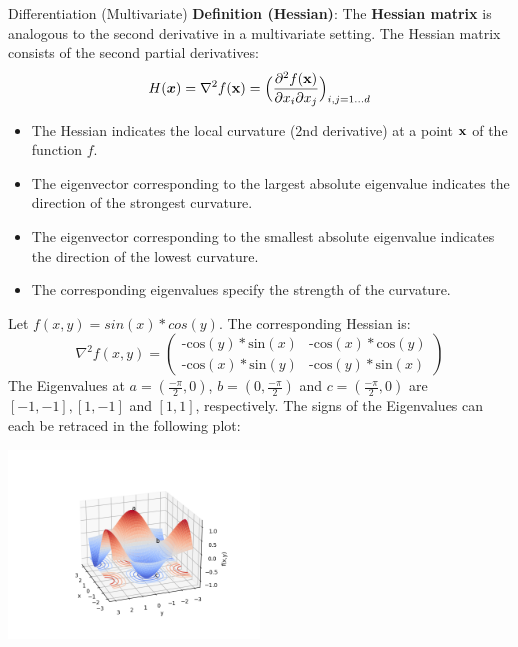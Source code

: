 \begin{vbframe}{Differentiation (Multivariate)}
  \textbf{Definition (Hessian)}: The \textbf{Hessian matrix} is analogous to the second derivative in a multivariate setting. The Hessian matrix consists of the second partial derivatives:
  \[ H(\boldsymbol{x}) =\nabla^2 f(\mathbf{x}) =
  \Bigl(\frac{\partial^2 f(\mathbf{x})}{\partial x_i \partial x_j}\Bigr)_{i,j=1\ldots d}\]
  \begin{itemize}
  \item The Hessian indicates the local curvature (2nd derivative) at a point $\mathbf{x}$ of the function $f$.
  \item The eigenvector corresponding to the largest absolute eigenvalue indicates the direction of the strongest curvature.
  \item The eigenvector corresponding to the smallest absolute eigenvalue indicates the direction of the lowest curvature.
  \item The corresponding eigenvalues specify the strength of the curvature.
  \end{itemize}


  \framebreak 

    Let $f(x,y) = sin(x) * cos(y)$.
    The corresponding Hessian is: 
    \vspace*{-0.2cm}
    $$
    \nabla^2 f(x,y) = \begin{pmatrix}
    \text{-cos}(y)*\text{sin}(x) & \text{-cos}(x)*\text{cos}(y) 
    \\ \text{-cos}(x)*\text{sin}(y) & \text{-cos}(y)*\text{sin}(x) 
    \end{pmatrix}
    $$
    \newline
    The Eigenvalues at $a=(\frac{-\pi}{2},0)$, $b=(0,\frac{-\pi}{2})$ and $c=(\frac{-\pi}{2},0)$ are $[-1, -1], [1, -1]$ and $[1, 1]$, respectively.
    The signs of the Eigenvalues can each be retraced in the following plot:
      
      \includegraphics[width = 0.5\textwidth]{figure_man/hessian_3d.png}
  
  \end{vbframe}
  \framebreak 

